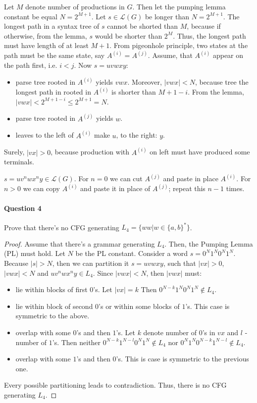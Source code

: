 Let $M$ denote number of productions in $G$.
Then let the pumping lemma constant be equal $N = 2^{M+1}$.
Let $s \in \mathcal{L}(G)$ be longer than $N = 2^{M+1}$.
The longest path in a syntax tree of $s$ cannot be shorted than $M$, because if otherwise, from the lemma, $s$ would be shorter than $2^M$.
Thus, the longest path must have length of at least $M+1$.
From pigeonhole principle, two states at the path must be the same state, say $A^{(i)} =  A^{(j)}$.
Assume, that  $A^{(i)}$ appear on the path first, i.e. $i<j$.
Now $s = uvwxy$:
\begin{itemize}
    \item parse tree rooted in  $A^{(i)}$ yields $vwx$.
    Moreover, $|vwx| < N$, because tree the longest path in rooted in  $A^{(i)}$ is shorter than $M+1 -i$.
    From the lemma, $|vwx| < 2^{M+1-i} \leq 2^{M+1} = N$.
    \item parse tree rooted in  $A^{(j)}$ yields $w$.
    \item leaves to the left of  $A^{(i)}$ make $u$, to the right: $y$.
\end{itemize}
Surely, $|vx| > 0$, because production with $A^{(i)}$ on left must have produced some terminals.

$s = uv^nwx^ny \in \mathcal{L}(G)$.
For $n=0$ we can cut $A^{(j)}$ and paste in place $A^{(i)}$.
For $n > 0$ we can copy $A^{(i)}$ and paste it in place of $A^{(j)}$; repeat this $n-1$ times.


\paragraph{Question 4}
Prove that there's no CFG generating $L_4 = \{ww | w\in\{a,b\}^*\}$.

\begin{proof}
Assume that there's a grammar generating $L_4$.
Then, the Pumping Lemma (PL) must hold.
Let $N$ be the PL constant.
Consider a word $s = 0^N1^N0^N1^N$.
Because $|s| > N$, then we can partition it $s = uvwxy$, such that $|vx|>0$, $|vwx| < N$ and $uv^nwx^ny \in L_4$.
Since $|vwx| < N$, then $|vwx|$ must:
\begin{itemize}
    \item lie within blocks of first $0$'s. Let $|vx| = k$
            Then $0^{N-k}1^N0^N1^N \notin L_4$.
    \item lie within block of second $0$'s or within some blocks of $1$'s. This case is symmetric to the above.
    \item overlap with some $0$'s and then $1$'s.
    Let $k$ denote number of $0$'s in $vx$ and $l$ - number of $1$'s.
    Then neither $0^{N-k}1^{N-l}0^N1^N \notin L_4$ nor $0^N1^N0^{N-k}1^{N-l} \notin L_4$.
     \item overlap with some $1$'s and then $0$'s.
     This is case is symmetric to the previous one.
\end{itemize}
Every possible partitioning leads to contradiction.
Thus, there is no CFG generating $L_4$.
\end{proof}

